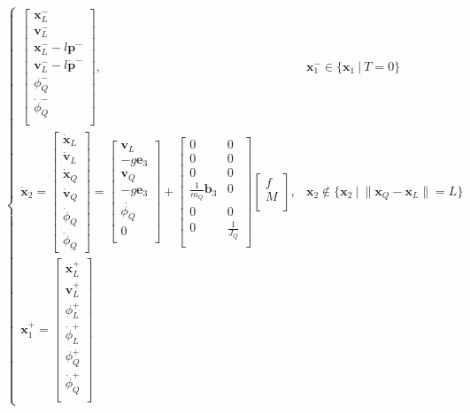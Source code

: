 \documentclass[11pt]{article}
\begin{document}
\[\begin{cases}
\begin{bmatrix}
       \mathbf{x}_L^- \\ \mathbf{v}_L^- \\ \mathbf{x}_L^- - l \mathbf{p}^- \\ \mathbf{v}_L^- - l \mathbf{\dot{p}}^- \\ \phi_Q^- \\ \dot{\phi}_Q^- \\
\end{bmatrix} , 
&  
\mathbf{x}_1^- \in \{ \mathbf{x}_1 \ | \  T = 0 \} \\
\dot{\mathbf{x}}_2 = 
\begin{bmatrix}
       \dot{\mathbf{x}}_L \\ \dot{\mathbf{v}}_L \\ \dot{\mathbf{x}}_Q \\ \dot{\mathbf{v}}_Q \\ \dot{\phi}_Q \\ \ddot{\phi}_Q
\end{bmatrix}
= 
\begin{bmatrix}
       \mathbf{v}_L \\
       -g \mathbf{e}_3 \\
       \mathbf{v}_Q \\
       -g \mathbf{e}_3 \\
       \dot{\phi_Q} \\
       0 \\
\end{bmatrix}
+ 
\begin{bmatrix}
       0 & 0 \\
       0 & 0 \\
       0 & 0 \\
       \frac{1}{m_Q} \mathbf{b}_3 & 0 \\
       0 & 0 \\
       0 & \frac{1}{J_Q} \\
\end{bmatrix}
\begin{bmatrix}
 	f \\
	M \\
\end{bmatrix},
& 
\mathbf{x}_2 \not\in \{ \mathbf{x}_2 \ | \  \| \mathbf{x}_Q - \mathbf{x}_L \| = L \} \\
\mathbf{x}_1^+ = 
\begin{bmatrix}
       \mathbf{x}_L^+ \\ \mathbf{v}_L^+ \\ \phi_L^+ \\ \dot{\phi}_L^+ \\ \phi_Q^+ \\ \dot{\phi}_Q^+ \\

\end{bmatrix}
\end{cases}\]
\end{document}
